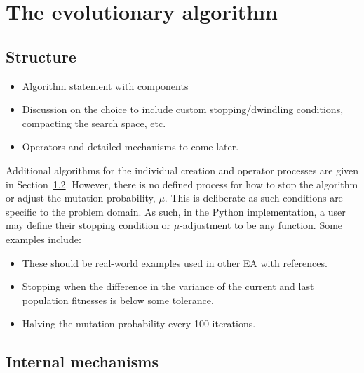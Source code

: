 \section{The evolutionary algorithm}\label{section:algorithm}

\subsection{Structure}

\begin{itemize}
    \item Algorithm statement with components
    \item Discussion on the choice to include custom stopping/dwindling
        conditions, compacting the search space, etc.
    \item Operators and detailed mechanisms to come later.
\end{itemize}










Additional algorithms for the individual creation and operator processes are
given in Section~\ref{subsection:mechanisms}. However, there is no defined
process for how to stop the algorithm or adjust the mutation probability,
\(\mu\). This is deliberate as such conditions are specific to the problem
domain. As such, in the Python implementation, a user may define their stopping
condition or \(\mu\)-adjustment to be any function. Some examples include:

\begin{itemize}
    \item These should be real-world examples used in other EA with references.
    \item Stopping when the difference in the variance of the current and last
        population fitnesses is below some tolerance.
    \item Halving the mutation probability every 100 iterations.
\end{itemize}
        

\subsection{Internal mechanisms}\label{subsection:mechanisms}

